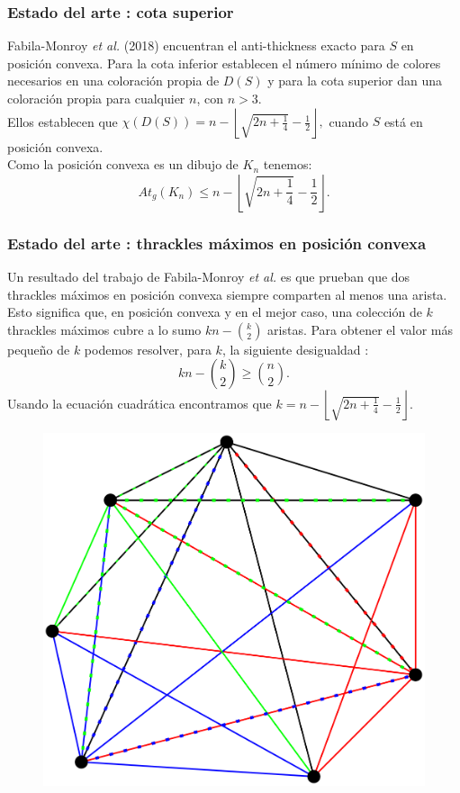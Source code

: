 \begin{frame}
\frametitle{Estado del arte : cota superior}

Fabila-Monroy \emph{et al.} (2018) encuentran el anti-thickness exacto para $S$ en posición convexa. Para la cota inferior establecen el número mínimo de colores necesarios en una coloración propia de $D(S)$ y para la cota superior dan una coloración propia para cualquier $n$, con $n>3$.
\pause 
\\[10pt]
Ellos establecen que $\chi(D(S)) = n - \left\lfloor\sqrt{2n + \frac{1}{4}} - \frac{1}{2} \right\rfloor, $ cuando $S$ está en posición convexa.
\pause
\\[10pt]
Como la posición convexa es un dibujo de $K_n$ tenemos: \[At_g(K_n) \leq n - \left\lfloor\sqrt{2n + \frac{1}{4}} - \frac{1}{2} \right\rfloor. \]
\end{frame}
\begin{frame}
\frametitle{Estado del arte : thrackles máximos en posición convexa}
Un resultado del trabajo de Fabila-Monroy \emph{et al.} es que prueban que dos thrackles máximos en posición convexa siempre comparten al menos una arista. Esto significa que, en posición convexa y en el mejor caso, una colección de $k$ thrackles máximos cubre a lo sumo $kn - \binom{k}{2}$ aristas. Para obtener el valor más pequeño de $k$ podemos resolver, para $k$, la siguiente desigualdad :
\[
  kn - \binom{k}{2} \geq \binom{n}{2}.
\]
Usando la ecuación cuadrática encontramos que $k = n - \left\lfloor\sqrt{2n + \frac{1}{4}} - \frac{1}{2} \right\rfloor.$
\end{frame}
\begin{frame}
\begin{figure}
	\centering
	\includegraphics[width=0.75\linewidth]{images/thrackles_maximos}
\end{figure}
\end{frame}

